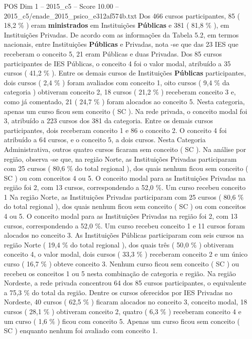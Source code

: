 \begin{textsample}{POS Dim 1 – 2015\_c5 – Score 10.00 – 2015\_c5/enade\_2015\_psico\_e312af574b.txt}
Dos 466 cursos participantes, 85 ( 18,2 \% ) eram \textbf{ministrados} em Instituições \textbf{Públicas} e 381 ( 81,8 \% ), em Instituições Privadas.
De acordo com as informações da Tabela 5.2, em termos nacionais, entre Instituições \textbf{Públicas} e Privadas, nota -se que das 23 IES que receberam o conceito 5, 21 eram Públicas e duas Privadas.
Dos 85 cursos participantes de IES Públicas, o conceito 4 foi o valor modal, atribuído a 35 cursos ( 41,2 \% ).
Entre os demais cursos de Instituições \textbf{Públicas} participantes, dois cursos ( 2,4 \% ) foram avaliados com conceito 1, oito cursos ( 9,4 \% da categoria ) obtiveram conceito 2, 18 cursos ( 21,2 \% ) receberam conceito 3 e, como já comentado, 21 ( 24,7 \% ) foram alocados ao conceito 5.
Nesta categoria, apenas um curso ficou sem conceito ( SC ).
Na rede privada, o conceito modal foi 3, atribuído a 223 cursos dos 381 da categoria.
Entre os demais cursos participantes, dois receberam conceito 1 e 86 o conceito 2.
O conceito 4 foi atribuído a 64 cursos, e o conceito 5, a dois cursos.
Nesta Categoria Administrativa, outros quatro cursos ficaram sem conceito ( SC ).
Na análise por região, observa -se que, na região Norte, as Instituições Privadas participaram com 25 cursos ( 80,6 \% do total regional ), dos quais nenhum ficou sem conceito ( SC ) ou com conceitos 4 ou 5.
O conceito modal para as Instituições Privadas na região foi 2, com 13 cursos, correspondendo a 52,0 \%.
Um curso recebeu conceito 1 Na região Norte, as Instituições Privadas participaram com 25 cursos ( 80,6 \% do total regional ), dos quais nenhum ficou sem conceito ( SC ) ou com conceitos 4 ou 5.
O conceito modal para as Instituições Privadas na região foi 2, com 13 cursos, correspondendo a 52,0 \%.
Um curso recebeu conceito 1 e 11 cursos foram alocados no conceito 3.
As Instituições Públicas participaram com seis cursos na região Norte ( 19,4 \% do total regional ), dos quais três ( 50,0 \% ) obtiveram conceito 4, o valor modal, dois cursos ( 33,3 \% ) receberam conceito 2 e um único curso ( 16,7 \% ) obteve conceito 3.
Nenhum curso ficou sem conceito ( SC ) ou recebeu os conceitos 1 ou 5 nesta combinação de categoria e região.
Na região Nordeste, a rede privada concentrou 64 dos 85 cursos participantes, o equivalente a 75,3 \% do total da região.
Dentre os cursos oferecidos por IES Privadas no Nordeste, 40 cursos ( 62,5 \% ) ficaram alocados no conceito 3, conceito modal, 18 cursos ( 28,1 \% ) obtiveram conceito 2, quatro ( 6,3 \% ) receberam conceito 4 e um curso ( 1,6 \% ) ficou com conceito 5.
Apenas um curso ficou sem conceito ( SC ) enquanto nenhum foi avaliado com conceito 1.

\end{textsample}
